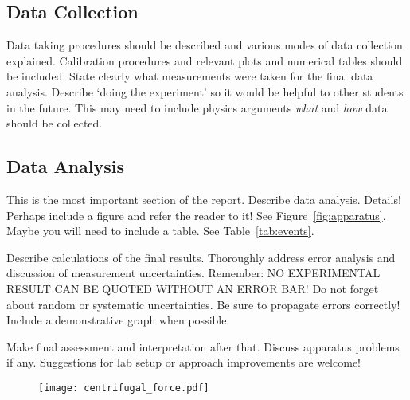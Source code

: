 \documentclass[12pt,letterpaper,onecolumn]{article}
\begin{document}
\subsection{Data Collection}

Data taking procedures should be described and various modes of
data collection explained. Calibration procedures and
relevant plots and numerical tables should be included.
State clearly what measurements were taken for the final
data analysis. Describe `doing the experiment' so it would
be helpful to other students in the future. This may need
to include physics arguments {\em what } and {\em how } data should
be collected.


\subsection{Data Analysis}

This is the most important section of the report.
Describe data analysis. Details! Perhaps include a figure and refer
the reader to it! See Figure~\ref{fig:apparatus}. Maybe you will need
to include a table. See Table~\ref{tab:events}.

Describe calculations of the final results.
Thoroughly address error analysis and discussion of measurement
uncertainties. Remember: NO EXPERIMENTAL RESULT CAN BE QUOTED
WITHOUT AN ERROR BAR! Do not forget about random or systematic
uncertainties. Be sure to propagate errors correctly!
Include a demonstrative graph when possible.


Make final assessment and interpretation after that.
Discuss apparatus problems if any. Suggestions for
lab setup or approach improvements are welcome!


\begin{figure}[h]
 \begin{center}
 \texttt{[image: centrifugal\_force.pdf]}
 \end{center}
\end{figure}
\end{document}
